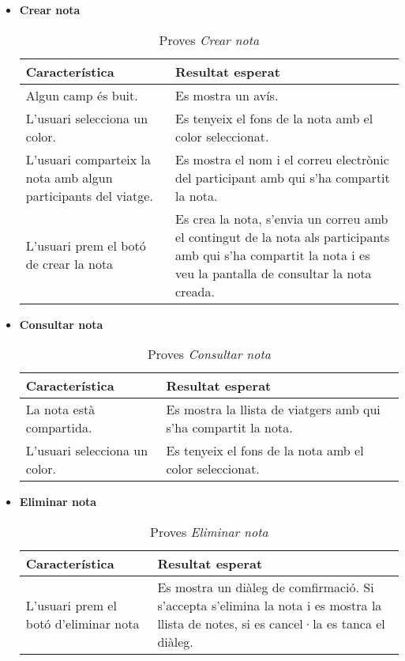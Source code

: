 \begin{itemize}
\item{}\textbf{Crear nota}

\begin{table}[!h]
\centering
\begin{tabular}{|T|T|}
\hline
\textbf{Característica}  & \textbf{Resultat esperat} \\\hline
Algun camp és buit. & Es mostra un avís.\\\hline
L'usuari selecciona un color. & Es tenyeix el fons de la nota amb el color seleccionat.\\\hline
L'usuari comparteix la nota amb algun participants del viatge. & Es mostra el nom i el correu electrònic del participant amb qui s'ha compartit la nota.\\\hline
L'usuari prem el botó de crear la nota & Es crea la nota, s'envia un correu amb el contingut de la nota als participants amb qui s'ha compartit la nota i es veu la pantalla de consultar la nota creada.\\\hline
\end{tabular}
\label{}
\caption{Proves \textit{Crear nota}}
\end{table}

\clearpage

\item{}\textbf{Consultar nota}

\begin{table}[!h]
\centering
\begin{tabular}{|T|T|}
\hline
\textbf{Característica}  & \textbf{Resultat esperat} \\\hline
La nota està compartida. & Es mostra la llista de viatgers amb qui s'ha compartit la nota.\\\hline
L'usuari selecciona un color. & Es tenyeix el fons de la nota amb el color seleccionat.\\\hline
\end{tabular}
\label{}
\caption{Proves \textit{Consultar nota}}
\end{table}

\item{}\textbf{Eliminar nota}

\begin{table}[!h]
\centering
\begin{tabular}{|T|T|}
\hline
\textbf{Característica}  & \textbf{Resultat esperat} \\\hline
L'usuari prem el botó d'eliminar nota & Es mostra un diàleg de comfirmació. Si s'accepta s'elimina la nota i es mostra la llista de notes, si es cancel·la es tanca el diàleg.\\\hline
\end{tabular}
\label{}
\caption{Proves \textit{Eliminar nota}}
\end{table}

\end{itemize}

